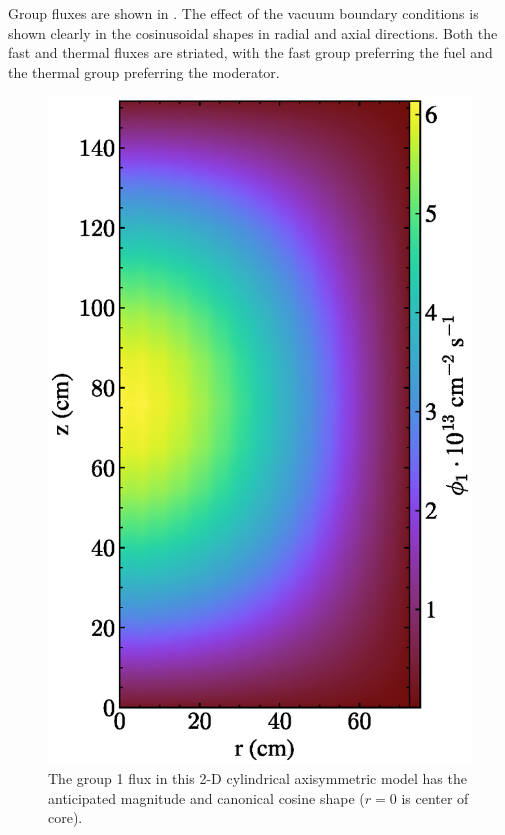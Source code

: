 \documentclass{article}
\begin{document}
Group fluxes are shown in . The effect of the vacuum
boundary conditions is shown clearly in the cosinusoidal shapes in radial and
axial directions. Both the fast and thermal fluxes are striated, with
the fast group preferring the fuel and the thermal group preferring the moderator.

\begin{figure}[htpb]
  \centering
  \includegraphics{2d_gamma_heating_group1.eps}
        \caption{The group 1 flux in this 2-D cylindrical axisymmetric model
        has the anticipated magnitude and canonical cosine shape ($r=0$ is center of core). }
  \label{fig:group1}
\end{figure}
\end{document}
